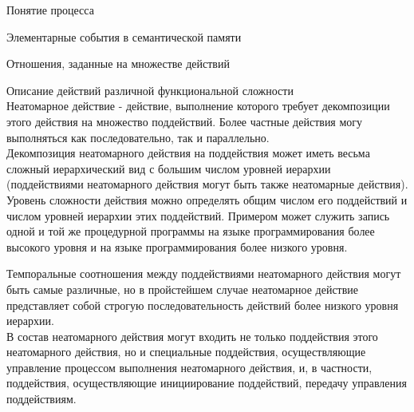 \begin{frame}{\large Понятие процесса}
\begin{frame}{\large Элементарные события в семантической памяти}
\begin{frame}{Отношения, заданные на множестве действий}
\begin{frame}{Описание действий различной функциональной сложности}
\topline
\justifying
 \\
Неатомарное действие - действие, выполнение которого требует декомпозиции этого действия на множество поддействий. Более частные действия могу выполняться как последовательно, так и параллельно. \\
Декомпозиция неатомарного действия на поддействия может иметь весьма сложный иерархический вид с большим числом уровней иерархии (поддействиями неатомарного действия могут быть также неатомарные действия).\\
Уровень сложности действия можно определять общим числом его поддействий и числом уровней иерархии этих поддействий. Примером может служить запись одной и той же процедурной программы на языке программирования более высокого уровня и на языке программирования более низкого уровня.\\
\end{frame}
\begin{frame}{}
Темпоральные соотношения между поддействиями неатомарного действия могут быть самые различные, но в пройстейшем случае неатомарное действие представляет собой строгую последовательность действий более низкого уровня иерархии.\\
В состав неатомарного действия могут входить не только поддействия этого неатомарного действия, но и специальные поддействия, осуществляющие управление процессом выполнения неатомарного действия, и, в частности, поддействия, осуществляющие инициирование поддействий, передачу управления поддействиям.
\end{frame}


\end{frame}
\end{frame}
\end{frame}
